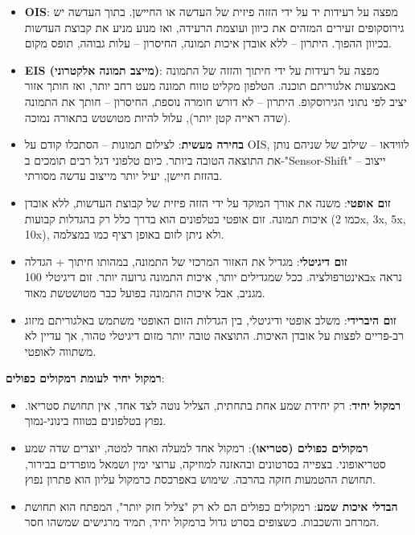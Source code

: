 \begin{itemize}
  \item \textbf{OIS}: מפצה על רעידות יד על ידי הזזה פיזית של העדשה או החיישן. בתוך העדשה יש גירוסקופים זעירים המזהים את כיוון ועוצמת הרעידה, ואז מנוע מניע את קבוצת העדשות בכיוון ההפוך. היתרון – ללא אובדן איכות תמונה, החיסרון – עלות גבוהה, תופס מקום.
  \item \textbf{EIS (מייצב תמונה אלקטרוני)}: מפצה על רעידות על ידי חיתוך והזזה של התמונה באמצעות אלגוריתם תוכנה. הטלפון מקליט טווח תמונה מעט רחב יותר, ואז חותך אזור יציב לפי נתוני הגירוסקופ. היתרון – לא דורש חומרה נוספת, החיסרון – חותך את התמונה (שדה ראייה קטן יותר), עלול להיות מטושטש בתאורה נמוכה.
  \item \textbf{בחירה מעשית}: לצילום תמונות – הסתכלו קודם על OIS, לווידאו – שילוב של שניהם נותן את התוצאה הטובה ביותר. כיום טלפוני דגל רבים תומכים ב-"Sensor-Shift" – ייצוב בהזזת חיישן, יעיל יותר מייצוב עדשה מסורתי.
\end{itemize}


\begin{itemize}
  \item \textbf{זום אופטי}: משנה את אורך המוקד על ידי הזזה פיזית של קבוצת העדשות, ללא אובדן איכות תמונה. זום אופטי בטלפונים הוא בדרך כלל רק בהגדלות קבועות (כמו 2x, 3x, 5x, 10x), ולא ניתן לזום באופן רציף כמו במצלמה.
  \item \textbf{זום דיגיטלי}: מגדיל את האזור המרכזי של התמונה, במהותו חיתוך + הגדלה באינטרפולציה. ככל שמגדילים יותר, איכות התמונה גרועה יותר. זום דיגיטלי 100x נראה מגניב, אבל איכות התמונה בפועל כבר מטושטשת מאוד.
  \item \textbf{זום היברידי}: משלב אופטי ודיגיטלי, בין הגדלות הזום האופטי משתמש באלגוריתם מיזוג רב-פריים לפצות על אובדן האיכות. התוצאה טובה יותר מזום דיגיטלי טהור, אך עדיין לא משתווה לאופטי.
\end{itemize}


\textbf{רמקול יחיד לעומת רמקולים כפולים}:

\begin{itemize}
  \item \textbf{רמקול יחיד}: רק יחידת שמע אחת בתחתית, הצליל נוטה לצד אחד, אין תחושת סטריאו. נפוץ בטלפונים בטווח בינוני-נמוך.
  \item \textbf{רמקולים כפולים (סטריאו)}: רמקול אחד למעלה ואחד למטה, יוצרים שדה שמע סטריאופוני. בצפייה בסרטונים ובהאזנה למוזיקה, ערוצי ימין ושמאל מופרדים בבירור, תחושת ההטמעות חזקה בהרבה. שימוש באפרכסת כרמקול עליון הוא פתרון נפוץ.
  \item \textbf{הבדלי איכות שמע}: רמקולים כפולים הם לא רק "צליל חזק יותר", המפתח הוא תחושת המרחב והשכבות. כשצופים בסרט גדול ברמקול יחיד, תמיד מרגישים שמשהו חסר.
\end{itemize}

